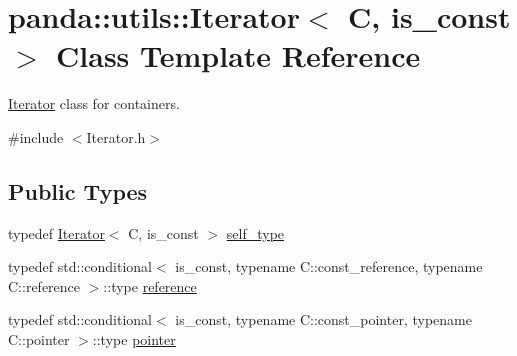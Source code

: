 \hypertarget{classpanda_1_1utils_1_1Iterator}{
\section{panda::utils::Iterator$<$ C, is\_\-const $>$ Class Template Reference}
\label{classpanda_1_1utils_1_1Iterator}
}


\hyperlink{classpanda_1_1utils_1_1Iterator}{Iterator} class for containers.  


{\ttfamily \#include $<$Iterator.h$>$}\subsection*{Public Types}
\begin{DoxyCompactItemize}
\item 
typedef \hyperlink{classpanda_1_1utils_1_1Iterator}{Iterator}$<$ C, is\_\-const $>$ \hyperlink{classpanda_1_1utils_1_1Iterator_a683ab6aa3c6fc4e12338d13e9e2f9694}{self\_\-type}
\item 
typedef std::conditional$<$ is\_\-const, typename C::const\_\-reference, typename C::reference $>$::type \hyperlink{classpanda_1_1utils_1_1Iterator_ac4ac97c60dc57aa24e36695240855a5c}{reference}
\item 
typedef std::conditional$<$ is\_\-const, typename C::const\_\-pointer, typename C::pointer $>$::type \hyperlink{classpanda_1_1utils_1_1Iterator_aad1c0f1ec4ce6fd567b46880b66769bf}{pointer}
\end{DoxyCompactItemize}

